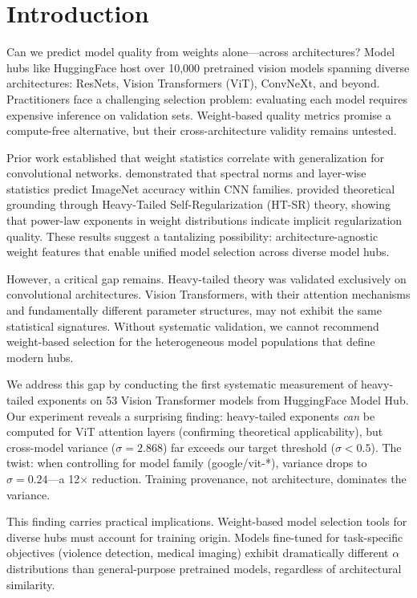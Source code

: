 \section{Introduction}

Can we predict model quality from weights alone---across architectures? Model hubs like HuggingFace host over 10,000 pretrained vision models spanning diverse architectures: ResNets, Vision Transformers (ViT), ConvNeXt, and beyond. Practitioners face a challenging selection problem: evaluating each model requires expensive inference on validation sets. Weight-based quality metrics promise a compute-free alternative, but their cross-architecture validity remains untested.

Prior work established that weight statistics correlate with generalization for convolutional networks. \citet{unterthiner2020predicting} demonstrated that spectral norms and layer-wise statistics predict ImageNet accuracy within CNN families. \citet{martin2021implicit} provided theoretical grounding through Heavy-Tailed Self-Regularization (HT-SR) theory, showing that power-law exponents in weight distributions indicate implicit regularization quality. These results suggest a tantalizing possibility: architecture-agnostic weight features that enable unified model selection across diverse model hubs.

However, a critical gap remains. Heavy-tailed theory was validated exclusively on convolutional architectures. Vision Transformers, with their attention mechanisms and fundamentally different parameter structures, may not exhibit the same statistical signatures. Without systematic validation, we cannot recommend weight-based selection for the heterogeneous model populations that define modern hubs.

We address this gap by conducting the first systematic measurement of heavy-tailed exponents on 53 Vision Transformer models from HuggingFace Model Hub. Our experiment reveals a surprising finding: heavy-tailed exponents \emph{can} be computed for ViT attention layers (confirming theoretical applicability), but cross-model variance ($\sigma = 2.868$) far exceeds our target threshold ($\sigma < 0.5$). The twist: when controlling for model family (google/vit-*), variance drops to $\sigma = 0.24$---a 12$\times$ reduction. Training provenance, not architecture, dominates the variance.

This finding carries practical implications. Weight-based model selection tools for diverse hubs must account for training origin. Models fine-tuned for task-specific objectives (violence detection, medical imaging) exhibit dramatically different $\alpha$ distributions than general-purpose pretrained models, regardless of architectural similarity.

